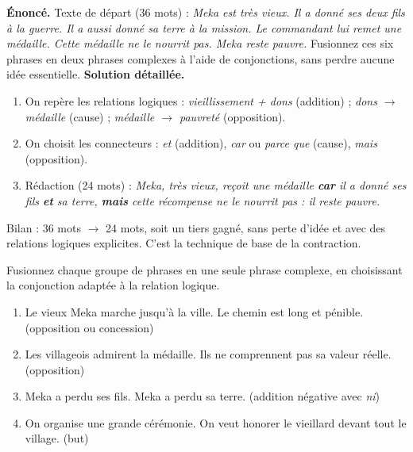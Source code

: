 \documentclass[11pt]{article}
\begin{document}
\begin{exoresolu}
\textbf{Énoncé.} Texte de départ (36 mots) : \emph{Meka est très vieux. Il a donné ses deux fils à la guerre. Il a aussi donné sa terre à la mission. Le commandant lui remet une médaille. Cette médaille ne le nourrit pas. Meka reste pauvre.} Fusionnez ces six phrases en deux phrases complexes à l'aide de conjonctions, sans perdre aucune idée essentielle.
\tcblower
\textbf{Solution détaillée.}
\begin{enumerate}
\item On repère les relations logiques : \emph{vieillissement + dons} (addition) ; \emph{dons $\rightarrow$ médaille} (cause) ; \emph{médaille $\rightarrow$ pauvreté} (opposition).
\item On choisit les connecteurs : \emph{et} (addition), \emph{car} ou \emph{parce que} (cause), \emph{mais} (opposition).
\item Rédaction (24 mots) : \emph{Meka, très vieux, reçoit une médaille \textbf{car} il a donné ses fils \textbf{et} sa terre, \textbf{mais} cette récompense ne le nourrit pas : il reste pauvre.}
\end{enumerate}
Bilan : 36 mots $\rightarrow$ 24 mots, soit un tiers gagné, sans perte d'idée et avec des relations logiques explicites. C'est la technique de base de la contraction.
\end{exoresolu}

\begin{exercice}
Fusionnez chaque groupe de phrases en une seule phrase complexe, en choisissant la conjonction adaptée à la relation logique.
\begin{enumerate}
\item Le vieux Meka marche jusqu'à la ville. Le chemin est long et pénible. (opposition ou concession)
\item Les villageois admirent la médaille. Ils ne comprennent pas sa valeur réelle. (opposition)
\item Meka a perdu ses fils. Meka a perdu sa terre. (addition négative avec \emph{ni})
\item On organise une grande cérémonie. On veut honorer le vieillard devant tout le village. (but)
\end{enumerate}
\end{exercice}
\end{document}
